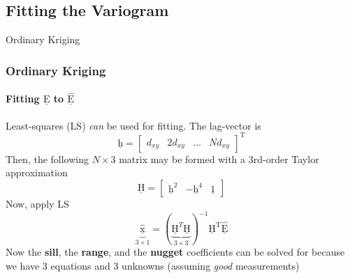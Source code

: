 \documentclass[professionalfont,10pt]{beamer}
\begin{document}
	\subsection{Fitting the Variogram}
	\begin{frame}[t]{Ordinary Kriging}
	\frametitle{Ordinary Kriging}
	\framesubtitle{Fitting $\underline{\text{E}}$ to $\hat{\underline{\text{E}}}$}
		\hskip-0.75cm
		\begin{minipage}[t]{0.2\linewidth}\vspace{-0.5cm}
			\tiny\tableofcontents[currentsection,currentsubsection,hideothersubsections,subsectionstyle=show/shaded]
		\end{minipage}
		\hfill%
		\begin{minipage}[t]{0.86\linewidth}\vspace{-0.5cm}
			Least-squares (LS) \textit{can} be used for fitting. The lag-vector is
			\begin{equation}
				\underline{\text{h}} = \left[\begin{array}{cccc}
					d_{xy} & 2d_{xy} & \dots & Nd_{xy}
				\end{array}\right]^\text{T}
			\end{equation}
			Then, the following $N \times 3$ matrix may be formed with a 3rd-order Taylor approximation
			\begin{equation}
				\underline{\text{H}}=
				\left[\begin{array}{ccc}
				\underline{\text{h}}^2 & -\underline{\text{h}}^4 & \underline{1}
				\end{array}\right]
			\end{equation}
			Now, apply LS
			\begin{equation}
				\underbrace{\hat{\underline{\text{x}}}}_{3 \times 1} = (\underbrace{\underline{\text{H}}^T\underline{\text{H}}}_{3 \times 3})^{-1}\underline{\text{H}}^\text{T}\hat{\underline{\text{E}}}
			\end{equation}
			Now the \textbf{sill}, the \textbf{range}, and the \textbf{nugget} coefficients can be solved for because we have 3 equations and 3 unknowns (assuming \textit{good} measurements)
		\end{minipage}
		\vfill%
	\end{frame}
\end{document}
